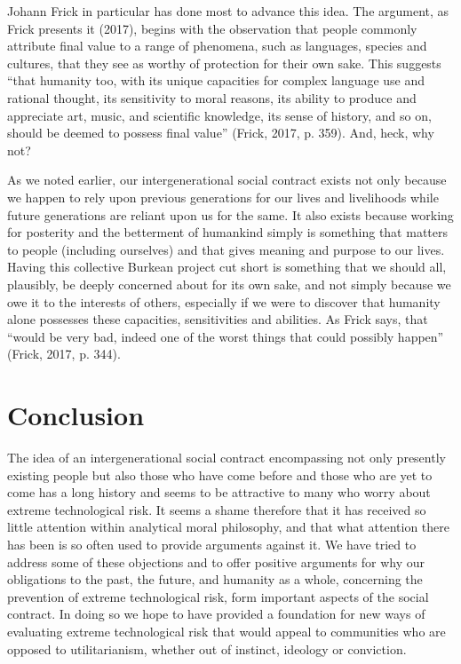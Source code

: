 \documentclass[man,11pt,a4paper]{apa7}
\begin{document}
Johann Frick in particular has done most to advance this idea. The argument, as Frick presents it (2017), begins with the observation that people commonly attribute final value to a range of phenomena, such as languages, species and cultures, that they see as worthy of protection for their own sake. This suggests ``that humanity too, with its unique capacities for complex language use and rational thought, its sensitivity to moral reasons, its ability to produce and appreciate art, music, and scientific knowledge, its sense of history, and so on, should be deemed to possess final value'' (Frick, 2017, p. 359). And, heck, why not?

As we noted earlier, our intergenerational social contract exists not only because we happen to rely upon previous generations for our lives and livelihoods while future generations are reliant upon us for the same. It also exists because working for posterity and the betterment of humankind simply is something that matters to people (including ourselves) and that gives meaning and purpose to our lives. Having this collective Burkean project cut short is something that we should all, plausibly, be deeply concerned about for its own sake, and not simply because we owe it to the interests of others, especially if we were to discover that humanity alone possesses these capacities, sensitivities and abilities. As Frick says, that ``would be very bad, indeed one of the worst things that could possibly happen'' (Frick, 2017, p. 344).

\section{Conclusion}

The idea of an intergenerational social contract encompassing not only presently existing people but also those who have come before and those who are yet to come has a long history and seems to be attractive to many who worry about extreme technological risk. It seems a shame therefore that it has received so little attention within analytical moral philosophy, and that what attention there has been is so often used to provide arguments against it. We have tried to address some of these objections and to offer positive arguments for why our obligations to the past, the future, and humanity as a whole, concerning the prevention of extreme technological risk, form important aspects of the social contract. In doing so we hope to have provided a foundation for new ways of evaluating extreme technological risk that would appeal to communities who are opposed to utilitarianism, whether out of instinct, ideology or conviction.
\end{document}
